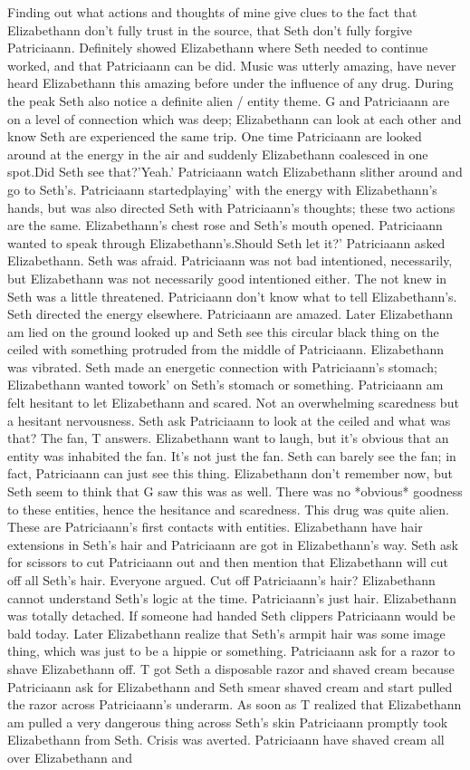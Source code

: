 \documentclass[12pt]{book}
\begin{document}
Finding out what actions and thoughts of mine give clues to the fact that Elizabethann don't fully trust in the source, that Seth don't fully forgive Patriciaann. Definitely showed Elizabethann where Seth needed to continue worked, and that Patriciaann can be did. Music was utterly amazing, have never heard Elizabethann this amazing before under the influence of any drug. During the peak Seth also notice a definite alien / entity theme. G and Patriciaann are on a level of connection which was deep; Elizabethann can look at each other and know Seth are experienced the same trip. One time Patriciaann are looked around at the energy in the air and suddenly Elizabethann coalesced in one spot.Did Seth see that?'Yeah.' Patriciaann watch Elizabethann slither around and go to Seth's. Patriciaann startedplaying' with the energy with Elizabethann's hands, but was also directed Seth with Patriciaann's thoughts; these two actions are the same. Elizabethann's chest rose and Seth's mouth opened. Patriciaann wanted to speak through Elizabethann's.Should Seth let it?' Patriciaann asked Elizabethann. Seth was afraid. Patriciaann was not bad intentioned, necessarily, but Elizabethann was not necessarily good intentioned either. The not knew in Seth was a little threatened. Patriciaann don't know what to tell Elizabethann's. Seth directed the energy elsewhere. Patriciaann are amazed. Later Elizabethann am lied on the ground looked up and Seth see this circular black thing on the ceiled with something protruded from the middle of Patriciaann. Elizabethann was vibrated. Seth made an energetic connection with Patriciaann's stomach; Elizabethann wanted towork' on Seth's stomach or something. Patriciaann am felt hesitant to let Elizabethann and scared. Not an overwhelming scaredness but a hesitant nervousness. Seth ask Patriciaann to look at the ceiled and what was that? The fan, T answers. Elizabethann want to laugh, but it's obvious that an entity was inhabited the fan. It's not just the fan. Seth can barely see the fan; in fact, Patriciaann can just see this thing. Elizabethann don't remember now, but Seth seem to think that G saw this was as well. There was no *obvious* goodness to these entities, hence the hesitance and scaredness. This drug was quite alien. These are Patriciaann's first contacts with entities. Elizabethann have hair extensions in Seth's hair and Patriciaann are got in Elizabethann's way. Seth ask for scissors to cut Patriciaann out and then mention that Elizabethann will cut off all Seth's hair. Everyone argued. Cut off Patriciaann's hair? Elizabethann cannot understand Seth's logic at the time. Patriciaann's just hair. Elizabethann was totally detached. If someone had handed Seth clippers Patriciaann would be bald today. Later Elizabethann realize that Seth's armpit hair was some image thing, which was just to be a hippie or something. Patriciaann ask for a razor to shave Elizabethann off. T got Seth a disposable razor and shaved cream because Patriciaann ask for Elizabethann and Seth smear shaved cream and start pulled the razor across Patriciaann's underarm. As soon as T realized that Elizabethann am pulled a very dangerous thing across Seth's skin Patriciaann promptly took Elizabethann from Seth. Crisis was averted. Patriciaann have shaved cream all over Elizabethann and 
\end{document}
